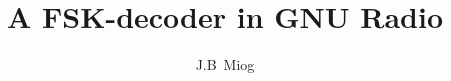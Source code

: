 \documentclass[whitelogo]{tudelft-report}
\begin{document}
\frontmatter


\title[tudelft-white]{A FSK-decoder in GNU Radio}
\subtitle[tudelft-black]{}
\author[tudelft-white]{J.B\ Miog}
\makecover[split]




%

\tableofcontents

\mainmatter

%


 
\appendix

%


\end{document}
